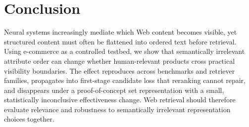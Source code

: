 \section{Conclusion}

Neural systems increasingly mediate which Web content becomes visible, yet structured content must often be flattened into ordered text before retrieval. Using e-commerce as a controlled testbed, we show that semantically irrelevant attribute order can change whether human-relevant products cross practical visibility boundaries. The effect reproduces across benchmarks and retriever families, propagates into first-stage candidate loss that reranking cannot repair, and disappears under a proof-of-concept set representation with a small, statistically inconclusive effectiveness change. Web retrieval should therefore evaluate relevance and robustness to semantically irrelevant representation choices together.
